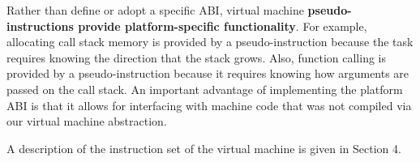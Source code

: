 Rather than define or adopt a specific ABI, virtual machine \textbf{pseudo-instructions
provide platform-specific functionality}.
For example, allocating call stack memory is provided by a pseudo-instruction
because the task requires knowing the direction that the stack grows.
Also, function calling is provided by a pseudo-instruction because
it requires knowing how arguments are passed on the call stack.
An important advantage of implementing the platform ABI is that it allows for interfacing
with machine code that was not compiled via our virtual machine abstraction.

A description of the instruction set of the virtual machine
is given in Section 4.
